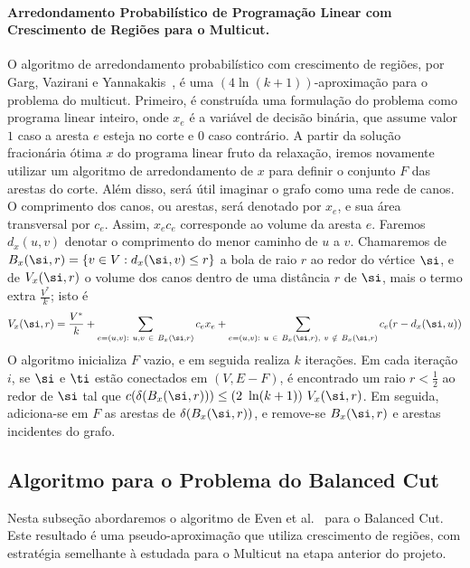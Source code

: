\documentclass[12pt, a4paper]{article}
\begin{document}
\paragraph{Arredondamento Probabilístico de Programação Linear com Crescimento de Regiões para o Multicut.}
O algoritmo de arredondamento probabilístico com crescimento de regiões, por Garg, Vazirani e Yannakakis~\cite{GVY1996}, é uma $(4 \ln(k+1))$-aproximação para o problema do multicut.
Primeiro, é construída uma formulação do problema como programa linear inteiro, onde $x_e$ é a variável de decisão binária, que assume valor $1$ caso a aresta $e$ esteja no corte e $0$ caso contrário. A partir da solução fracionária ótima $x$ do programa linear fruto da relaxação, iremos novamente utilizar um algoritmo de arredondamento de $x$ para definir o conjunto $F$ das arestas do corte.
%
Além disso, será útil imaginar o grafo como uma rede de canos. O comprimento dos canos, ou arestas, será denotado por $x_e$, e sua área transversal por $c_e$. Assim, $x_e c_e$ corresponde ao volume da aresta $e$. Faremos $d_x(u, v)$ denotar o comprimento do menor caminho de $u$ a $v$.
Chamaremos de $B_x(\si, r) = \{v \in V: d_x(\si, v) \leq r\}$ a bola de raio $r$ ao redor do vértice $\si$, e de $V_x(\si, r)$ o volume dos canos dentro de uma distância $r$ de $\si$, mais o termo extra $\frac{V^*}{k}$; isto é
\[
    V_x(\si, r) = \frac{V^*}{k}
    + \sum_{e=(u, v):\ u, v \ \in\ B_x(\si, r)} c_e x_e
    + \sum_{e=(u, v):\ u\ \in\ B_x(\si, r),\ v\ \notin\ B_x(\si, r)} c_e(r - d_x(\si, u))
\]
%
O algoritmo inicializa $F$ vazio, e em seguida realiza $k$ iterações. 
Em cada iteração $i$, se $\si$ e $\ti$ estão conectados em $(V, E-F)$, é encontrado um raio $r < \frac{1}{2}$ ao redor de $\si$ tal que $c(\delta(B_x(\si, r))) \leq (2\ \ln(k+1))\ V_x(\si, r)$. Em seguida, adiciona-se em $F$ as arestas de $\delta(B_x(\si, r))$, e remove-se $B_x(\si, r)$ e arestas incidentes do grafo.

\subsection{Algoritmo para o Problema do Balanced Cut}
Nesta subseção abordaremos o algoritmo de Even et al.~\cite{ENRS1999} para o Balanced Cut. Este resultado é uma pseudo-aproximação que utiliza crescimento de regiões, com estratégia semelhante à estudada para o Multicut na etapa anterior do projeto.
\end{document}
